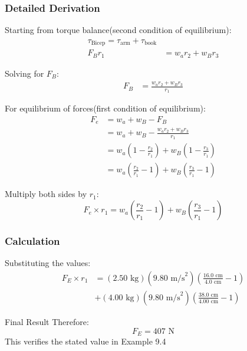 \documentclass{beamer}
\begin{document}
\begin{frame}
\frametitle{Detailed Derivation}

Starting from torque balance(second condition of equilibrium):
\begin{align*}
\tau_{\text{Bicep}}=\tau_{\text{arm}}+\tau_{\text{book}} \\
F_B r_1 &= w_a r_2 + w_B r_3
\end{align*}

Solving for $F_B$:
\begin{align*}
F_B &= \frac{w_a r_2 + w_B r_3}{r_1}
\end{align*}

For equilibrium of forces(first condition of equilibrium):
\begin{align*}
F_e &= w_a + w_B - F_B \\
&= w_a + w_B - \frac{w_a r_2 + w_B r_3}{r_1} \\
&= w_a\left(1 - \frac{r_2}{r_1}\right) + w_B\left(1 - \frac{r_3}{r_1}\right) \\
&= w_a\left(\frac{r_2}{r_1} - 1\right) + w_B\left(\frac{r_3}{r_1} - 1\right)
\end{align*}
\end{frame}
\begin{frame}
Multiply both sides by $r_1$:
\begin{equation*}
F_e \times r_1 = w_a\left(\frac{r_2}{r_1} - 1\right) + w_B\left(\frac{r_3}{r_1} - 1\right)
\end{equation*}
\end{frame}

\begin{frame}
\frametitle{Calculation}
Substituting the values:
\begin{align*}
F_E \times r_1 &= (2.50 \text{ kg})(9.80 \text{ m/s}^2)\left(\frac{16.0 \text{ cm}}{4.0 \text{ cm}}-1\right) \\
&+ (4.00 \text{ kg})(9.80 \text{ m/s}^2)\left(\frac{38.0 \text{ cm}}{4.00 \text{ cm}}-1\right)
\end{align*}

\begin{block}{Final Result}
Therefore:
\[F_E = 407 \text{ N}\]
This verifies the stated value in Example 9.4
\end{block}
\end{frame}
\end{document}
